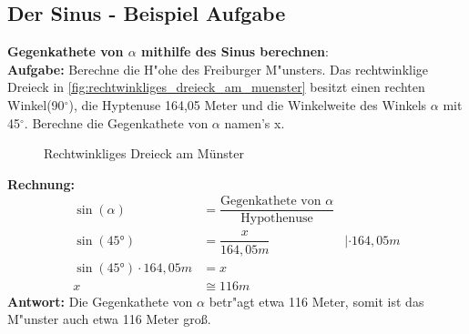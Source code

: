 \documentclass{standalone}
\begin{document}
\subsection{Der Sinus - Beispiel Aufgabe}
\textbf{Gegenkathete von $\alpha$ mithilfe des Sinus berechnen}: \\
\textbf{Aufgabe:} Berechne die H{"o}he des Freiburger M{"u}nsters. Das rechtwinklige Dreieck in \autoref{fig:rechtwinkliges_dreieck_am_muenster} besitzt einen rechten Winkel(90$^\circ$), die Hyptenuse 164,05 Meter und die Winkelweite des Winkels $\alpha$ mit 45$^\circ$. Berechne die Gegenkathete von $\alpha$ namen's x.\\
\begin{figure}[hb!]
  \centeringf
  \def\svgwidth{300px}
  
  \caption{Rechtwinkliges Dreieck am Münster}
  \label{fig:rechtwinkliges_dreieck_am_muenster}
\end{figure}

\noindent\textbf{Rechnung:}
\begin{align}
  \sin(\alpha)            & = \dfrac{\text{Gegenkathete von $\alpha$}}{\text{Hypothenuse}} \tag{1}                  \\
  \sin(45°)               & = \dfrac{x}{164,05m}                                                   & |\cdot 164,05m \\
  \sin(45°) \cdot 164,05m & = x                                                                                     \\
  x                       & \cong 116m
\end{align}
\textbf{Antwort:} Die Gegenkathete von $\alpha$ betr{"a}gt etwa 116 Meter, somit ist das M{"u}nster auch etwa 116 Meter gro{\ss}.
\end{document}
